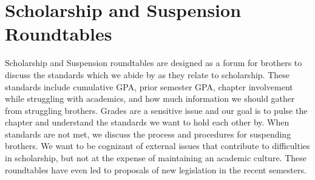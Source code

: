   \section*{Scholarship and Suspension Roundtables}
    Scholarship and Suspension roundtables are designed as a forum for brothers to discuss the standards which we abide by as they relate to scholarship. These standards include cumulative GPA, prior semester GPA, chapter involvement while struggling with academics, and how much information we should gather from struggling brothers. Grades are a sensitive issue and our goal is to pulse the chapter and understand the standards we want to hold each other by. When standards are not met, we discuss the process and procedures for suspending brothers. We want to be cognizant of external issues that contribute to difficulties in scholarship, but not at the expense of maintaining an academic culture. These roundtables have even led to proposals of new legislation in the recent semesters.
